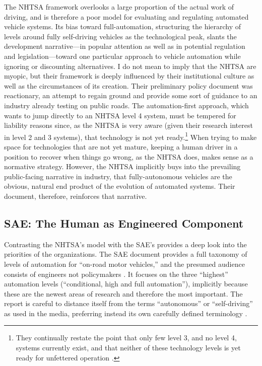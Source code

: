 The NHTSA framework overlooks a large proportion of the actual work of
driving, and is therefore a poor model for evaluating and
regulating automated vehicle systems. Its bias toward
full-automation, structuring the hierarchy of levels around fully
self-driving vehicles as the technological peak, slants the
development narrative---in popular attention as well as in
potential regulation and legislation---toward one particular approach
to vehicle automation while ignoring or discounting alternatives. I do
not mean to imply that the NHTSA are myopic, but their framework is
deeply influenced by their institutional culture as well as the
circumstances of its creation. Their preliminary policy document was
reactionary, an attempt to regain ground and provide some sort of guidance to an
industry already testing on public roads. The automation-first
approach, which wants to jump directly to an NHTSA level 4 system,
must be tempered for liability reasons since, as the 
NHTSA is very aware (given their research interest in level 2 and 3
systems), that technology is not yet ready.\footnote{They continually
  restate the point that only few level 3, and no level 4, systems
  currently exist, and that neither of these technology levels is yet
  ready for unfettered operation \cite[p. 10, 14]{NHTSA}.} When trying to make space for
technologies that are not yet mature, keeping a human driver in a
position to recover when things go wrong, as the NHTSA does, makes sense as a normative
strategy. However, the NHTSA implicitly buys into the prevailing
public-facing narrative in industry, that fully-autonomous vehicles
are the obvious, natural end product of the evolution of automated
systems. Their document, therefore, reinforces that narrative.

\subsection{SAE: The Human as Engineered Component}

Contrasting the NHTSA's model with the SAE's provides a deep look into
the priorities of the organizations. The SAE document provides a full
taxonomy of levels of automation for ``on-road motor vehicles,'' and the
presumed audience consists of engineers not policymakers \cite{SAE}. It
focuses on the three ``highest'' automation levels (``conditional, high
and full automation''), implicitly because these are the newest areas
of research and therefore the most important. The report is careful to
distance itself from the terms ``autonomous'' or ``self-driving'' as used
in the media, preferring instead its own carefully defined
terminology \cite[p. 5-6]{SAE}. 

